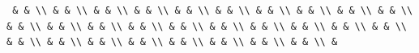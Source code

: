 \documentclass[
]{article}
\begin{document}
\begin{verbatim}
 & & \\ & & \\ & & \\ & & \\ & & \\ & & \\ & & \\ & & \\ & & \\ & & \\ & & \\ & & \\ & & \\ & & \\ & & \\ & & \\ & & \\ & & \\ & & \\ & & \\ & & \\ & & \\ & & \\ & & \\ & & \\ & & \\ & & \\ & & \\ & 
\end{verbatim}
\end{document}
